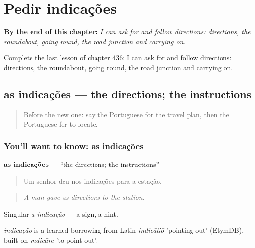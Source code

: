 
\chapter{Pedir indicações}
\label{ch:pt-pedir-indicacoes}

\begin{chapteropening}
\textbf{By the end of this chapter:} \emph{I can ask for and follow directions: directions, the roundabout, going round, the road junction and carrying on.}

Complete the last lesson of chapter 436: I can ask for and follow directions: directions, the roundabout, going round, the road junction and carrying on.
\end{chapteropening}

\section[as indicações]{as indicações — the directions; the instructions}

\label{lesson:PT-C436-indicacoes}



\begin{quote}
Before the new one: say the Portuguese for the travel plan, then the Portuguese for to locate.
\end{quote}

\subsection*{You'll want to know: as indicações}
\textbf{as indicações} — \textquotedblleft{}the directions; the instructions\textquotedblright{}.

\begin{quote}
Um senhor deu-nos indicações para a estação.
\end{quote}

\begin{quote}
\emph{A man gave us directions to the station.}
\end{quote}

Singular \emph{a indicação} — a sign, a hint.

\begin{cousinweb}
\emph{indicação} is a learned borrowing from Latin \emph{indicātiō} 'pointing out' (EtymDB), built on \emph{indicāre} 'to point out'.
\end{cousinweb}

